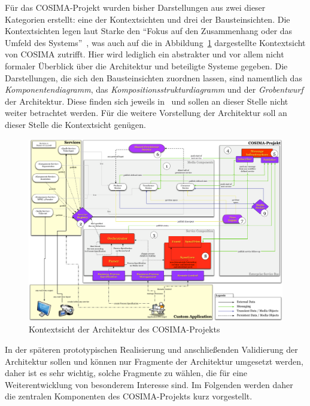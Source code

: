   Für das COSIMA-Projekt wurden bisher Darstellungen aus zwei dieser Kategorien erstellt: eine der Kontextsichten und drei der Bausteinsichten. Die Kontextsichten legen laut Starke den "`Fokus auf den Zusammenhang oder das Umfeld des Systems"'~\citep[S. 87]{effektive_software_architekturen}, was auch auf die in Abbildung~\ref{fig:Kontextsicht_Architektur_COSIMA} dargestellte Kontextsicht von COSIMA zutrifft. Hier wird lediglich ein abstrakter und vor allem nicht formaler Überblick über die Architektur und beteiligte Systeme gegeben. Die Darstellungen, die sich den Bausteinsichten zuordnen lassen, sind namentlich das \emph{Komponentendiagramm}, das \emph{Kompositionsstrukturdiagramm} und der \emph{Grobentwurf} der Architektur. Diese finden sich jeweils in~\citep{bericht} und sollen an dieser Stelle nicht weiter betrachtet werden. Für die weitere Vorstellung der Architektur soll an dieser Stelle die Kontextsicht genügen.

  \begin{figure}
    \centering
    \includegraphics[width=\textwidth]{images/Kontextsicht_Architektur_COSIMA}
    \caption{Kontextsicht der Architektur des COSIMA-Projekts}
    \label{fig:Kontextsicht_Architektur_COSIMA}
  \end{figure}

  In der späteren prototypischen Realisierung und anschließenden Validierung der Architektur sollen und können nur Fragmente der Architektur umgesetzt werden, daher ist es sehr wichtig, solche Fragmente zu wählen, die für eine Weiterentwicklung von besonderem Interesse sind. Im Folgenden werden daher die zentralen Komponenten des COSIMA-Projekts kurz vorgestellt.

